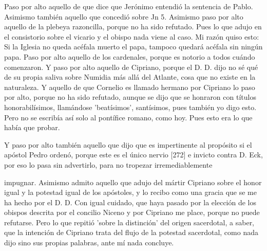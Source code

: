 Paso por alto aquello de que dice que Jerónimo entendió la sentencia de Pablo. Asimismo también aquello que concedió sobre Jn 5. Asimismo paso por alto aquello de la plebeya razoncilla, porque no ha sido refutado. Pues lo que adujo en el consistorio sobre el vicario y el obispo nada viene al caso. Mi razón quiso esto: Si la Iglesia no queda acéfala muerto el papa, tampoco quedará acéfala sin ningún papa. Paso por alto aquello de los cardenales, porque es notorio a todos cuándo comenzaron. Y paso por alto aquello de Cipriano, porque el D. D. dijo no sé qué de su propia saliva sobre Numidia más allá del Atlante, cosa que no existe en la naturaleza. Y aquello de que Cornelio es llamado hermano por Cipriano lo paso por alto, porque no ha sido refutado, aunque se dijo que se honraron con títulos honorabilísimos, llamándose 'beatísimos', santísimos, pues también yo digo esto. Pero no se escribía así solo al pontífice romano, como hoy. Pues esto era lo que había que probar.

Y paso por alto también aquello que dijo que es impertinente al propósito si el apóstol Pedro ordenó, porque este es el único nervio [272] e invicto contra D. Eck, por eso lo pasa sin advertirlo, para no tropezar irremediablemente

impugnar. Asimismo admito aquello que adujo del mártir Cipriano sobre el honor igual y la potestad igual de los apóstoles, y lo recibo como una gracia que se me ha hecho por el D. D. Con igual cuidado, que haya pasado por la elección de los obispos descrita por el concilio Niceno y por Cipriano me place, porque no puede refutarse. Pero lo que repitió 'sobre la distinción' del origen sacerdotal, a saber, que la intención de Cipriano trata del flujo de la potestad sacerdotal, como nada dijo sino sus propias palabras, ante mí nada concluye.

